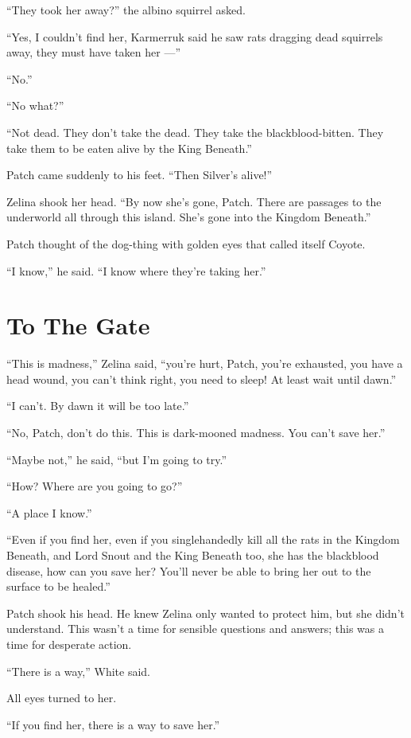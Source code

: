 \documentclass[12pt]{memoir}
\begin{document}
“They took her away?” the albino squirrel asked.

“Yes, I couldn’t find her, Karmerruk said he saw rats dragging dead
squirrels away, they must have taken her —”

“No.”

“No what?”

“Not dead. They don’t take the dead. They take the
blackblood-bitten. They take them to be eaten alive by the King
Beneath.”

Patch came suddenly to his feet. “Then Silver’s alive!”

Zelina shook her head. “By now she’s gone, Patch. There are passages
to the underworld all through this island. She’s gone into the Kingdom
Beneath.”

Patch thought of the dog-thing with golden eyes that called itself
Coyote.

“I know,” he said. “I know where they’re taking her.”


\section{To The Gate}

“This is madness,” Zelina said, “you’re hurt, Patch, you’re exhausted,
you have a head wound, you can’t think right, you need to sleep! At
least wait until dawn.”

“I can’t. By dawn it will be too late.”

“No, Patch, don’t do this. This is dark-mooned madness. You can’t save
her.”

“Maybe not,” he said, “but I’m going to try.”

“How? Where are you going to go?”

“A place I know.”

“Even if you find her, even if you singlehandedly kill all the rats in
the Kingdom Beneath, and Lord Snout and the King Beneath too, she has
the blackblood disease, how can you save her? You’ll never be able to
bring her out to the surface to be healed.”

Patch shook his head. He knew Zelina only wanted to protect him, but
she didn’t understand. This wasn’t a time for sensible questions and
answers; this was a time for desperate action.

“There is a way,” White said.

All eyes turned to her.

“If you find her, there is a way to save her.”
\end{document}

